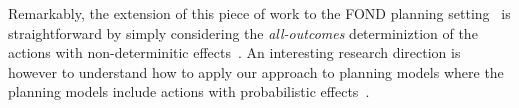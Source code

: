 \documentclass[letterpaper]{article} %
\begin{document}
Remarkably, the extension of this piece of work to the FOND planning setting~\cite{muise2012improved} is straightforward by simply considering the {\em all-outcomes} determiniztion of the actions with non-determinitic effects~\cite{yoon2007ff}. An interesting research direction is however to understand how to apply our approach to planning models where the planning models include actions with probabilistic effects~\cite{younes2005first}.  



\end{document}
